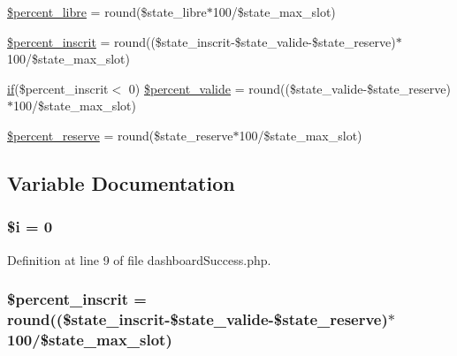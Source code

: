 \begin{DoxyCompactItemize}
\item 
\hyperlink{dashboard_success_8php_aeedf724f187110e0b5f9c28ee654577b}{\$percent\-\_\-libre} = round(\$state\-\_\-libre$\ast$100/\$state\-\_\-max\-\_\-slot)
\item 
\hyperlink{dashboard_success_8php_ac03c20507069eb4aa471480a173f33ba}{\$percent\-\_\-inscrit} = round((\$state\-\_\-inscrit-\/\$state\-\_\-valide-\/\$state\-\_\-reserve)$\ast$100/\$state\-\_\-max\-\_\-slot)
\item 
\hyperlink{live_2modules_2tournament_2templates_2__form_team_8php_ae30a307b320d8da5d9a945eaf68f7549}{if}(\$percent\-\_\-inscrit$<$ 0) \hyperlink{dashboard_success_8php_aea43f590fe7a34919eabb2ed29d8aa0d}{\$percent\-\_\-valide} = round((\$state\-\_\-valide-\/\$state\-\_\-reserve)$\ast$100/\$state\-\_\-max\-\_\-slot)
\item 
\hyperlink{dashboard_success_8php_a23da4a29d9c1250ffead2a95108677d3}{\$percent\-\_\-reserve} = round(\$state\-\_\-reserve$\ast$100/\$state\-\_\-max\-\_\-slot)
\end{DoxyCompactItemize}


\subsection{Variable Documentation}
\hypertarget{dashboard_success_8php_a83018d9153d17d91fbcf3bc10158d34f}{
\subsubsection[{\$i}]{\setlength{\rightskip}{0pt plus 5cm}\${\bf i} = 0}}\label{dashboard_success_8php_a83018d9153d17d91fbcf3bc10158d34f}


Definition at line 9 of file dashboard\-Success.\-php.

\hypertarget{dashboard_success_8php_ac03c20507069eb4aa471480a173f33ba}{
\subsubsection[{\$percent\-\_\-inscrit}]{\setlength{\rightskip}{0pt plus 5cm}\$percent\-\_\-inscrit = round((\$state\-\_\-inscrit-\/\$state\-\_\-valide-\/\$state\-\_\-reserve)$\ast$100/\$state\-\_\-max\-\_\-slot)}}\label{dashboard_success_8php_ac03c20507069eb4aa471480a173f33ba}



